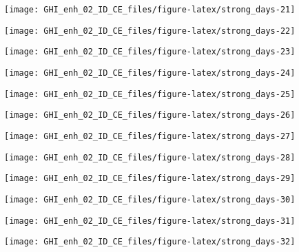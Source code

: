 \documentclass[
  10pt,
  a4paper,oneside]{article}
\begin{document}
\begin{center}\texttt{[image: GHI\_enh\_02\_ID\_CE\_files/figure-latex/strong\_days-21]} \end{center}

\begin{center}\texttt{[image: GHI\_enh\_02\_ID\_CE\_files/figure-latex/strong\_days-22]} \end{center}

\begin{center}\texttt{[image: GHI\_enh\_02\_ID\_CE\_files/figure-latex/strong\_days-23]} \end{center}

\begin{center}\texttt{[image: GHI\_enh\_02\_ID\_CE\_files/figure-latex/strong\_days-24]} \end{center}

\begin{center}\texttt{[image: GHI\_enh\_02\_ID\_CE\_files/figure-latex/strong\_days-25]} \end{center}

\begin{center}\texttt{[image: GHI\_enh\_02\_ID\_CE\_files/figure-latex/strong\_days-26]} \end{center}

\begin{center}\texttt{[image: GHI\_enh\_02\_ID\_CE\_files/figure-latex/strong\_days-27]} \end{center}

\begin{center}\texttt{[image: GHI\_enh\_02\_ID\_CE\_files/figure-latex/strong\_days-28]} \end{center}

\begin{center}\texttt{[image: GHI\_enh\_02\_ID\_CE\_files/figure-latex/strong\_days-29]} \end{center}

\begin{center}\texttt{[image: GHI\_enh\_02\_ID\_CE\_files/figure-latex/strong\_days-30]} \end{center}

\begin{center}\texttt{[image: GHI\_enh\_02\_ID\_CE\_files/figure-latex/strong\_days-31]} \end{center}

\begin{center}\texttt{[image: GHI\_enh\_02\_ID\_CE\_files/figure-latex/strong\_days-32]} \end{center}
\end{document}
